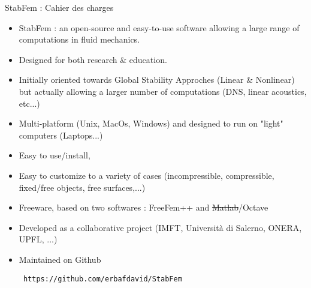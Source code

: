 \documentclass{beamer}
\newcommand{\ssp}{\vspace{.2cm} }
\begin{document}
\begin{frame}{StabFem : Cahier des charges }

\begin{itemize}[<+->]

\item StabFem : an open-source and easy-to-use software allowing a large range of computations in fluid mechanics.

\item Designed for both research  \& education.

\item Initially  oriented towards Global Stability Approches (Linear \& Nonlinear) but actually allowing a larger number of computations
(DNS, linear acoustics, etc...)

\item Multi-platform (Unix, MacOs, Windows) and designed to run on "light" computers (Laptops...)

\item Easy to use/install, 


\item Easy to customize to a variety of cases (incompressible, compressible, fixed/free objects, free surfaces,...)

\item Freeware, based on two softwares : FreeFem++ and \sout{Matlab}/{\color{red}Octave }

\item Developed as a collaborative project
(IMFT, Università di Salerno, ONERA, UPFL, ...)

\item Maintained on Github

\ssp
{\color{orange}
\verb! https://github.com/erbafdavid/StabFem !
}

\end{itemize}

\end{frame}
\end{document}
